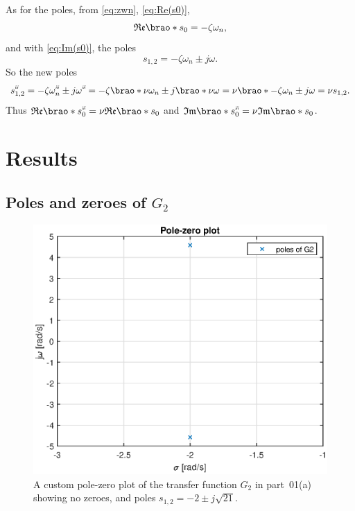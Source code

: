 \documentclass[12pt]{article}
\DeclarePairedDelimiter\brao()%
\newcommand{\setprime}[2][1]{%
    {#2}^{%
        \raisebox{1pt}{%
            \scalebox{0.5}{%
                \itshape\sffamily\uppercase%
                \expandafter{%
                    \romannumeral#1%
                }%
            }%
        }
    }%
}%
\begin{document}
\begin{enumerate}[(a)]
        As for the poles, from \eqref{eq:zwn}, \eqref{eq:Re(s0)},
        \begin{equation}
            \mathfrak{Re}\brao*{s_0} = -\zeta\omega_n,
        \end{equation}
        and with \eqref{eq:Im(s0)}, the poles
        \begin{equation}
            s_{1,2} = -\zeta\omega_n \pm j\omega.
        \end{equation}
        So the new poles
        \begin{equation}
              \setprime[3]s_{1,2}
            = -\zeta\setprime[3]\omega_n \pm j\setprime[3]\omega
            = -\zeta\brao*{\nu\omega_n} \pm j\brao*{\nu\omega}
            = \nu\brao*{-\zeta\omega_n \pm j\omega}
            = \nu s_{1,2}.
        \end{equation}
        Thus $\mathfrak{Re}\brao*{\setprime[3]s_0} = \nu\mathfrak{Re}\brao*{s_0}$
        and $\mathfrak{Im}\brao*{\setprime[3]s_0} = \nu\mathfrak{Im}\brao*{s_0}$.
\end{enumerate}



\section{Results}

\subsection{Poles and zeroes of $G_2$}

\begin{figure}
    \centering
    \includegraphics[width=\linewidth]{img/part01a_pzplot.eps}
    \caption{A custom pole-zero plot of the transfer function $G_2$ in part~01(a) showing no zeroes, and poles $s_{1,2} = -2 \pm j\sqrt{21}$.}
    \label{fig:pzplot_1a}
\end{figure}
\end{document}
